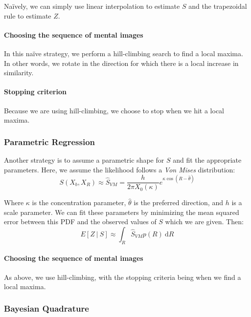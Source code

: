 \documentclass{article} %
\begin{document}
Na\"ively, we can simply use linear interpolation to estimate $S$ and
the trapezoidal rule to estimate $Z$.

\paragraph{Choosing the sequence of mental images}

In this naïve strategy, we perform a hill-climbing search to find a
local maxima. In other words, we rotate in the direction for which
there is a local increase in similarity.

\paragraph{Stopping criterion}

Because we are using hill-climbing, we choose to stop when we hit a
local maxima.

\subsubsection{Parametric Regression}

Another strategy is to assume a parametric shape for $S$ and fit the
appropriate parameters. Here, we assume the likelihood follows a
\emph{Von Mises} distribution:
\begin{equation}
  S(X_b, X_R) \approx \hat{S}_{VM}=\frac{h}{2\pi X_0(\kappa)}e^{\kappa\cos(R-\hat{\theta})}
\end{equation}

Where $\kappa$ is the concentration parameter, $\hat{\theta}$ is the
preferred direction, and $h$ is a scale parameter. We can fit these
parameters by minimizing the mean squared error between this PDF and
the observed values of $S$ which we are given. Then:
\begin{equation}
E[Z\ \vert \ S]\approx \int_R \hat{S}_{VM}p(R)\ \mathrm{d}R
\end{equation}

\paragraph{Choosing the sequence of mental images}

As above, we use hill-climbing, with the stopping criteria being when
we find a local maxima.

\subsubsection{Bayesian Quadrature}
\end{document}
